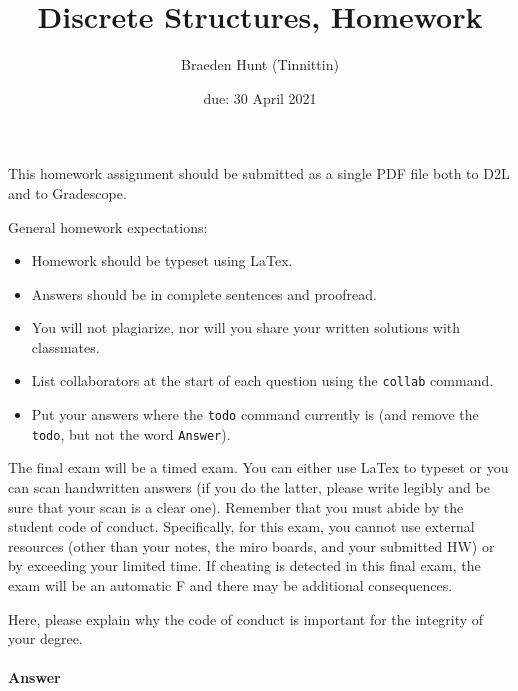 \documentclass{article}
\title{Discrete Structures, Homework \hwnum}
\author{Braeden Hunt (Tinnittin)}
\date{due: 30 April 2021}
\begin{document}
\maketitle

This homework assignment should be
submitted as a single PDF file both to D2L and to Gradescope.

General homework expectations:
\begin{itemize}
    \item Homework should be typeset using LaTex.
    \item Answers should be in complete sentences and proofread.
    \item You will not plagiarize, nor will you share your written solutions
        with classmates.
    \item List collaborators at the start of each question using the \texttt{collab} command.
    \item Put your answers where the \texttt{todo} command currently is (and
        remove the \texttt{todo}, but not the word \texttt{Answer}).
\end{itemize}


 

The final exam will be a timed exam.  You can either use LaTex to typeset or you
can scan handwritten answers (if you do the latter, please write legibly and be
sure that your scan is a clear one).  Remember that you must abide by the
student code of conduct.  Specifically, for this exam, you cannot use external
resources (other than your notes, the miro boards, and your submitted HW) or by
exceeding your limited time.  If cheating is detected in this final exam, the
exam will be an automatic F and there may be additional consequences.

Here, please explain why the code of conduct is important for the integrity of
your degree.

\paragraph{Answer}
\end{document}
